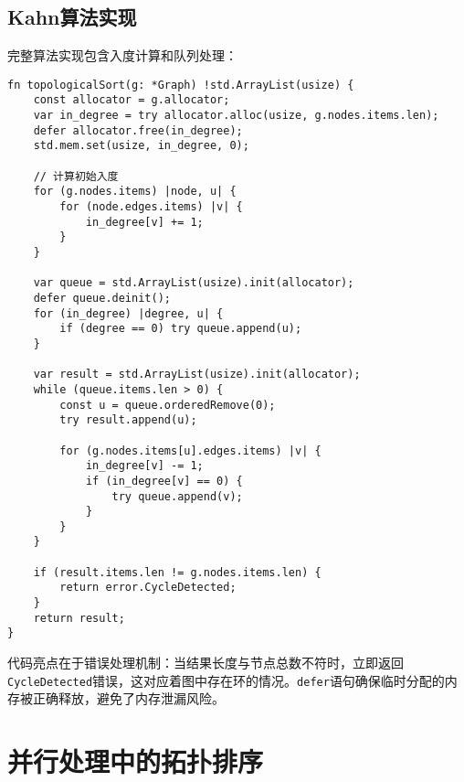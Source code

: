 \section{Kahn算法实现}
完整算法实现包含入度计算和队列处理：\par
\begin{lstlisting}[language=zig]
fn topologicalSort(g: *Graph) !std.ArrayList(usize) {
    const allocator = g.allocator;
    var in_degree = try allocator.alloc(usize, g.nodes.items.len);
    defer allocator.free(in_degree);
    std.mem.set(usize, in_degree, 0);

    // 计算初始入度
    for (g.nodes.items) |node, u| {
        for (node.edges.items) |v| {
            in_degree[v] += 1;
        }
    }

    var queue = std.ArrayList(usize).init(allocator);
    defer queue.deinit();
    for (in_degree) |degree, u| {
        if (degree == 0) try queue.append(u);
    }

    var result = std.ArrayList(usize).init(allocator);
    while (queue.items.len > 0) {
        const u = queue.orderedRemove(0);
        try result.append(u);

        for (g.nodes.items[u].edges.items) |v| {
            in_degree[v] -= 1;
            if (in_degree[v] == 0) {
                try queue.append(v);
            }
        }
    }

    if (result.items.len != g.nodes.items.len) {
        return error.CycleDetected;
    }
    return result;
}
\end{lstlisting}
代码亮点在于错误处理机制：当结果长度与节点总数不符时，立即返回\verb!CycleDetected!错误，这对应着图中存在环的情况。\verb!defer!语句确保临时分配的内存被正确释放，避免了内存泄漏风险。\par
\chapter{并行处理中的拓扑排序}
